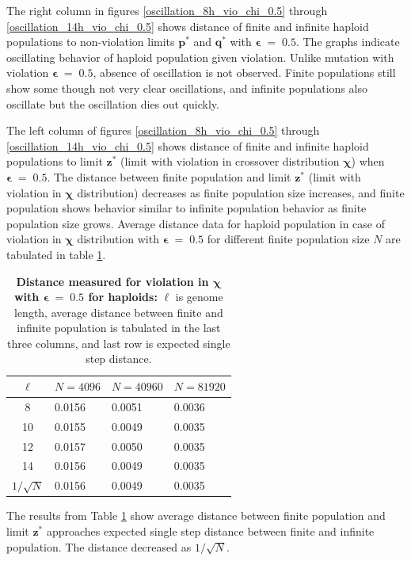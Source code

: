 \clearpage

The right column in figures \ref{oscillation_8h_vio_chi_0.5} through \ref{oscillation_14h_vio_chi_0.5} 
shows distance of finite and infinite haploid populations to non-violation limits $\bm{p^\ast}$ and $\bm{q^\ast}$ with $\bm{\epsilon} \;=\; 0.5$. 
The graphs indicate oscillating behavior of haploid population given violation. 
Unlike mutation with violation $\bm{\epsilon} \;=\; 0.5$, absence of oscillation is not observed. 
Finite populations still show some though not very clear oscillations, and infinite populations 
also oscillate but the oscillation dies out quickly. 

The left column of figures \ref{oscillation_8h_vio_chi_0.5} through \ref{oscillation_14h_vio_chi_0.5} 
shows distance of finite and infinite haploid populations to limit $\bm{z^\ast}$ 
(limit with violation in crossover distribution $\bm{\chi}$) when $\bm{\epsilon} \;=\; 0.5$. 
The distance between finite population and limit $\bm{z}^\ast$ (limit with violation in $\bm{\chi}$ distribution) 
decreases as finite population size increases, 
and finite population shows behavior similar to infinite population behavior as finite population size grows. 
Average distance data for haploid population in case of violation in $\bm{\chi}$ distribution 
with $\bm{\epsilon} \;=\; 0.5$ for different finite population size $N$ are tabulated in table \ref{distanceChiHapEps0.5}. 

\begin{table}[ht]
\caption{\textbf{Distance measured for violation in $\bm{\chi}$ with $\bm{\epsilon} \;=\; 0.5$  for haploids:} $\ell$ is genome length, 
average distance between finite and infinite population is tabulated in the last three columns, and last row is expected single step distance.}
\centering
\begin{tabularx}{0.75\textwidth}{ c *{3}{X}}
\toprule
$\ell$ & $N = 4096$ & $N = 40960$ & $N = 81920$  \\
\midrule
8 & 0.0156	&  0.0051	& 0.0036 \\
10 & 0.0155	&  0.0049	& 0.0035 \\
12 & 0.0157	&  0.0050	& 0.0035 \\
14 & 0.0156	&  0.0049	& 0.0035 \\      
\midrule
$1/\sqrt{N}$ & 0.0156 & 0.0049 & 0.0035 \\
\bottomrule
\end{tabularx}
\label{distanceChiHapEps0.5}
\end{table} 

The results from Table \ref{distanceChiHapEps0.5} show average distance 
between finite population and limit $\bm{z^\ast}$ approaches expected single step distance 
between finite and infinite population. The distance decreased as $1/\sqrt{N}$. 








